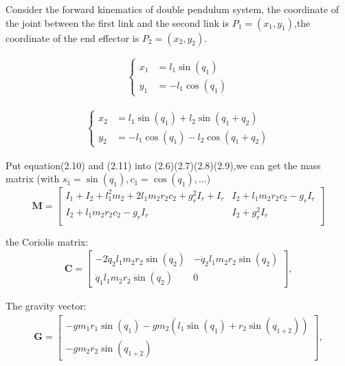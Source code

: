    Consider the forward kinematics of double pendulum system, the coordinate of the joint between the first link and the second link is \(P_1=(x_1,y_1)\),the coordinate of the end effector is \(P_2=(x_2,y_2)\).

    \begin{align}
        \label{eq:first_set}
        \left\{
        \begin{aligned}
        x_1 &= l_1 \sin(q_1) \\
        y_1 &= - l_1 \cos(q_1)
        \end{aligned}
        \right.
    \end{align}

    \begin{align}
        \label{eq:second_set}
        \left\{
        \begin{aligned}
        x_2 &= l_1 \sin(q_1) + l_2 \sin(q_1 + q_2) \\
        y_2 &= -l_1 \cos(q_1) - l_2 \cos(q_1 + q_2)
        \end{aligned}
        \right.
    \end{align}

    Put equation(2.10) and (2.11) into (2.6)(2.7)(2.8)(2.9),we can get the mass matrix (with \(s_1 = \sin(q_1), c_1 = \cos(q_1), \ldots\))
    \begin{equation}
    \mathbf{M} =
    \left[ 
    {\begin{array}{cc}
    I_1 + I_2 + l_1^2m_2 + 2l_1m_2r_2c_2 + g_r^2I_r + I_r  &   I_2 + l_1m_2r_2c_2 - g_rI_r  \\
    I_2 + l_1m_2r_2c_2 - g_rI_r                    & I_2 + g_r^2I_r                       \\
    \end{array}} 
    \right]
    \end{equation}
    
    the Coriolis matrix:
    \begin{equation}
    \begin{split}
    \mathbf{C} = \left[
    \begin{matrix}
    -2 \dot{q}_2 l_{1} m_{2} r_{2} \sin(q_2) & -\dot{q}_2 l_{1} m_{2} r_{2} \sin(q_2)\\
    \dot{q}_1 l_{1} m_{2} r_{2} \sin(q_2) & 0
    \end{matrix}
    \right],
    \label{eq:coriolis_matrix}
    \end{split}
    \end{equation}
    
    The gravity vector:
    \begin{equation}
    \begin{split}
    \mathbf{G} = \left[
    \begin{matrix}
    - g m_{1} r_{1} \sin(q_1) - g m_{2} \left(l_{1} \sin(q_1) + r_{2} \sin(q_{1+2}) \right) \\
    - g m_{2} r_{2} \sin(q_{1+2})
    \end{matrix}
    \right],
    \label{eq:gravity_matrix}
    \end{split}
    \end{equation}
    
